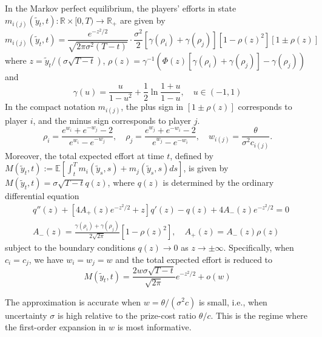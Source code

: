\documentclass[mnsc]{informs3}
\begin{document}
\begin{theorem}
In the Markov perfect equilibrium, the players’ efforts in state $m_{i(j)}(\tilde{y}_t, t) :\mathbb{R}\times[0, T)\to\mathbb{R}_+$ are given by
\begin{equation}\label{eq-equilibrium-effort}
m_{i(j)}(\tilde{y}_t, t) = \frac{e^{-z^2/2}}{\sqrt{2\pi\sigma^2(T-t)}}\cdot \frac{\sigma^2}{2}\left[\gamma(\rho_{i}) + \gamma(\rho_{j})\right]\left[1-\rho(z)^2\right]\left[1 \pm \rho(z)\right]
\end{equation}
where $z = \tilde{y}_t / (\sigma\sqrt{T-t})$, $\rho(z) = \gamma^{-1}\left(\Phi(z)\left[\gamma(\rho_{i})+\gamma(\rho_{j})\right]-\gamma(\rho_{j})\right)$ and
\begin{equation}\label{eq-gamma}
\gamma(u) = \frac{u}{1-u^2} + \frac{1}{2}\ln\frac{1+u}{1-u},\quad u\in(-1,1)
\end{equation}
In the compact notation $m_{i(j)}$, the plus sign in $[1\pm\rho(z)]$ corresponds to player $i$, and the minus sign corresponds to player $j$.
\begin{equation*}
\rho_{i} = \frac{e^{w_{i}}+e^{-w_{j}}-2}{e^{w_{i}}-e^{-w_{j}}},
\quad
\rho_{j} = \frac{e^{w_{j}}+e^{-w_{i}}-2}{e^{w_{j}}-e^{-w_{i}}},
\quad
w_{i(j)} = \frac{\theta}{\sigma^2 c_{i(j)}}.
\end{equation*}
Moreover, the total expected effort at time $t$, defined by $M(\tilde{y}_t, t) := \mathbb{E}\left[\int^T_t m_i(\tilde{y}_s, s) + m_j(\tilde{y}_s, s)ds\right]$, is given by $M(\tilde{y}_t, t) = \sigma \sqrt{T-t} q(z)$, where $q(z)$ is determined by the ordinary differential equation
\begin{equation}
\begin{aligned}
&q''(z) + \left[4A_+(z)e^{-z^2/2}+z\right]q'(z) - q(z) + 4A_-(z)e^{-z^2/2} = 0\\
&A_-(z) = \frac{\gamma(\rho_i) + \gamma(\rho_j)}{2\sqrt{2\pi}}[1 - \rho(z)^2],
\quad A_+(z) = A_-(z)\rho(z)
\end{aligned}
\end{equation}
subject to the boundary conditions $q(z)\to0$ as $z\to\pm\infty$.
Specifically, when $c_i = c_j$, we have $w_i = w_j = w$ and the total expected effort is reduced to
\begin{equation}\label{eq-totaleffort-reduced}
M(\tilde{y}_t, t) = \frac{2w\sigma\sqrt{T-t}}{\sqrt{2\pi}}e^{-z^2/2} + o(w)
\end{equation}
\end{theorem}

\begin{remark}
The approximation is accurate when $w=\theta/(\sigma^2 c)$ is small, i.e., when uncertainty $\sigma$ is high relative to the prize-cost ratio $\theta/c$. This is the regime where the first-order expansion in $w$ is most informative.
\end{remark}
\end{document}
